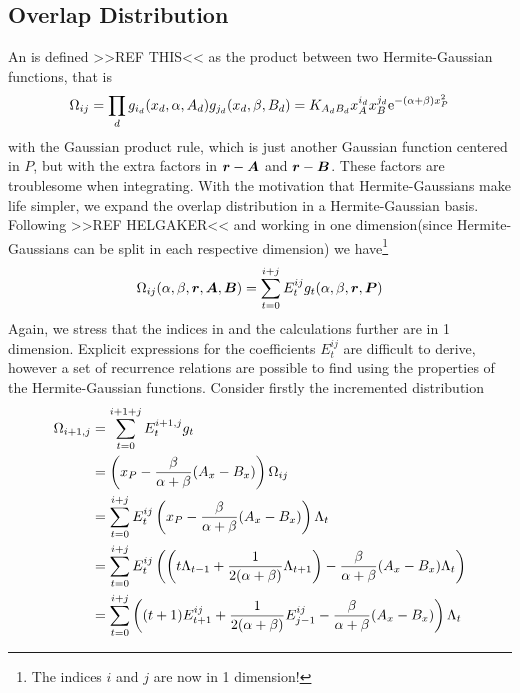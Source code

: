 \subsection{Overlap Distribution}
    An  is defined >>REF THIS<< as the product
    between two Hermite-Gaussian functions, that is
        \begin{equation}
            \Omega_{ij} = \prod_d g_{i_d}(x_d,\alpha,A_d)g_{j_d}(x_d,\beta,B_d)
            =
            K_{A_dB_d}x_A^{i_d}x_B^{j_d}\mathrm{e}^{-(\alpha+\beta)x^2_P}
        \end{equation}
    with the Gaussian product rule, which is just another Gaussian function
    centered in $P$, but with the extra  factors in
    $\boldsymbol{{r}}-\boldsymbol{{A}}$ and $\boldsymbol{{r}}-\boldsymbol{{B}}$. These factors are troublesome
    when integrating. With the motivation that Hermite-Gaussians make life
    simpler, we expand the overlap distribution in a Hermite-Gaussian basis.
    Following >>REF HELGAKER<< and working in one dimension(since
    Hermite-Gaussians can be split in each respective dimension) we
    have\footnote{The indices $i$ and $j$ are now in 1 dimension!}
        \begin{equation}
            \Omega_{ij}(\alpha,\beta,\blds{r},\blds{A},\blds{B}) =
            \sum\limits^{i+j}_{t=0} E^{ij}_tg_t(\alpha,\beta,\blds{r},\blds{P})
            \label{eq:omegaDef}
        \end{equation}
    Again, we stress that the indices in  and the calculations
    further are in 1 dimension. Explicit expressions for the coefficients
    $E^{ij}_t$ are difficult to derive, however a set of recurrence relations
    are possible to find using the properties of the Hermite-Gaussian
    functions. Consider firstly the incremented distribution
        \begin{align}
            \Omega_{i+1,j} &= \sum^{i+1+j}_{t=0} E^{i+1,j}_tg_t \nonumber \\
            &= \left(x_P -
            \frac{\beta}{\alpha+\beta}(A_x-B_x)\right)\Omega_{ij}
            \nonumber \\
            &= \suml{t=0}{i+j} E^{ij}_t\left(x_P -
            \frac{\beta}{\alpha+\beta}(A_x-B_x)\right) \Lambda_t \nonumber \\
            &= \suml{t=0}{i+j} E^{ij}_t\left(\left(t\Lambda_{t-1} +
            \frac{1}{2(\alpha+\beta)}\Lambda_{t+1}\right) -
            \frac{\beta}{\alpha+\beta}(A_x-B_x)\Lambda_t\right) \nonumber \\
            &= \suml{t=0}{i+j} \left((t+1)E^{ij}_{t+1} +
            \frac{1}{2(\alpha+\beta)}E^{ij}_{j-1} -
            \frac{\beta}{\alpha+\beta}(A_x-B_x)\right)\Lambda_t
            \label{eq:omegaIncr}
        \end{align}
